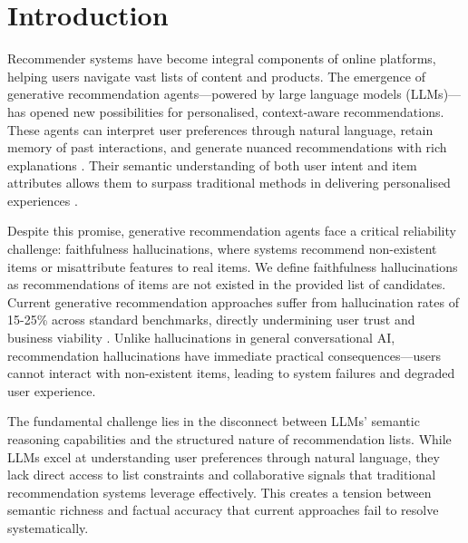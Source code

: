 \documentclass[acmsmall]{acmart}
\begin{document}
\section{Introduction}

Recommender systems have become integral components of online platforms, helping users navigate vast lists of content and products. The emergence of generative recommendation agents—powered by large language models (LLMs)—has opened new possibilities for personalised, context-aware recommendations. These agents can interpret user preferences through natural language, retain memory of past interactions, and generate nuanced recommendations with rich explanations \cite{park2024llm, kang2023conversationalrec}. Their semantic understanding of both user intent and item attributes allows them to surpass traditional methods in delivering personalised experiences \cite{baltrunas2015frappe}.

Despite this promise, generative recommendation agents face a critical reliability challenge: faithfulness hallucinations, where systems recommend non-existent items or misattribute features to real items. We define faithfulness hallucinations as recommendations of items are not existed in the provided list of candidates. Current generative recommendation approaches suffer from hallucination rates of 15-25\% across standard benchmarks, directly undermining user trust and business viability \cite{thompson2024user}. Unlike hallucinations in general conversational AI, recommendation hallucinations have immediate practical consequences—users cannot interact with non-existent items, leading to system failures and degraded user experience.

The fundamental challenge lies in the disconnect between LLMs' semantic reasoning capabilities and the structured nature of recommendation lists. While LLMs excel at understanding user preferences through natural language, they lack direct access to list constraints and collaborative signals that traditional recommendation systems leverage effectively. This creates a tension between semantic richness and factual accuracy that current approaches fail to resolve systematically.
\end{document}
